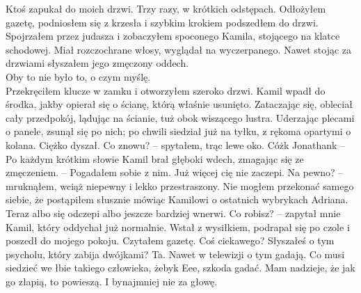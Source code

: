 \documentclass[../MAIN.tex]{subfiles}
\begin{document}
% 
% 
% 
% 
% 
Ktoś zapukał do moich drzwi. Trzy razy, w krótkich odstępach. Odłożyłem gazetę, podniosłem się z krzesła i szybkim krokiem podszedłem do drzwi. Spojrzałem przez judasza i zobaczyłem spoconego Kamila, stojącego na klatce schodowej. Miał rozczochrane włosy, wyglądał na wyczerpanego. Nawet stojąc za drzwiami słyszałem jego zmęczony oddech.\\
Oby to nie było to, o czym myślę.\\
Przekręciłem klucze w zamku i otworzyłem szeroko drzwi. Kamil wpadł do środka, jakby opierał się o ścianę, którą właśnie usunięto. Zataczając się, obleciał cały przedpokój, lądując na ścianie, tuż obok wiszącego lustra. Uderzając plecami o panele, zsunął się po nich; po chwili siedział już na tyłku, z rękoma opartymi o kolana. Ciężko dyszał.
\sx Co znowu? -- spytałem, trąc lewe oko.
\xx Cóż\3k Jonathan\3k -- Po każdym krótkim słowie Kamil brał głęboki wdech, zmagając się ze zmęczeniem. -- Pogadałem sobie z nim. Już więcej cię nie zaczepi.
\xx Na pewno? -- mruknąłem, wciąż niepewny i lekko przestraszony.
\qd
Nie mogłem przekonać samego siebie, że postąpiłem słusznie mówiąc Kamilowi o ostatnich wybrykach Adriana. Teraz albo się odczepi albo jeszcze bardziej wnerwi.
\sx Co robisz? -- zapytał mnie Kamil, który oddychał już normalnie. Wstał z wysiłkiem, podrapał się po czole i poszedł do mojego pokoju.
\xx Czytałem gazetę.
\xx Coś ciekawego?
\xx Słyszałeś o tym psycholu, który zabija dwójkami?
\xx Ta. Nawet w telewizji o tym gadają. Co musi siedzieć we łbie takiego człowieka, żeby\3k Eee, szkoda gadać. Mam nadzieje, że jak go złapią, to powieszą. I bynajmniej nie za głowę.
\qd
\end{document}
